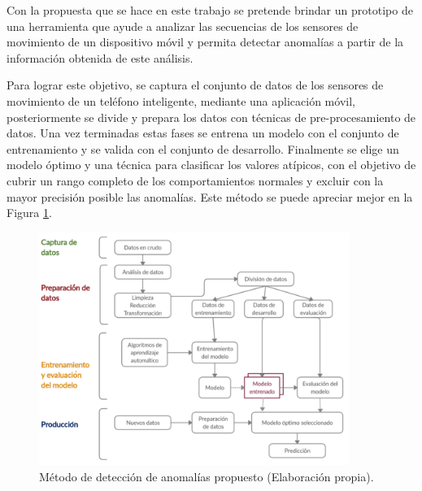 \vspace{5mm} %

Con la propuesta que se hace en este trabajo se pretende brindar un prototipo de una herramienta que ayude a analizar las secuencias de los sensores de movimiento de un dispositivo m\'{o}vil y permita detectar anomalías a partir de la información obtenida de este análisis. 

\vspace{5mm} %

Para lograr este objetivo, se captura el conjunto de datos de los sensores de movimiento de un tel\'{e}fono inteligente, mediante una aplicaci\'{o}n m\'{o}vil, posteriormente se divide y prepara los datos con t\'{e}cnicas de pre-procesamiento de datos. Una vez terminadas estas fases se entrena un modelo con el conjunto de entrenamiento y se valida con el conjunto de desarrollo. Finalmente se elige un modelo \'{o}ptimo y una t\'{e}cnica para clasificar los valores at\'{i}picos, con el objetivo de cubrir un rango completo de los comportamientos normales y excluir con la mayor precisi\'{o}n posible las anomal\'{i}as. Este m\'{e}todo se puede apreciar mejor en la Figura \ref{fig:modeloAnomalias}.

\begin{figure}[h!]
  \begin{center}	\includegraphics[width=0.90\textwidth,frame]{imagenes/Cap2/metodo1}
  \caption{M\'{e}todo de detecci\'{o}n de anomal\'{i}as propuesto (Elaboraci\'{o}n propia).}
  \label{fig:modeloAnomalias}
  \end{center}
\end{figure}


